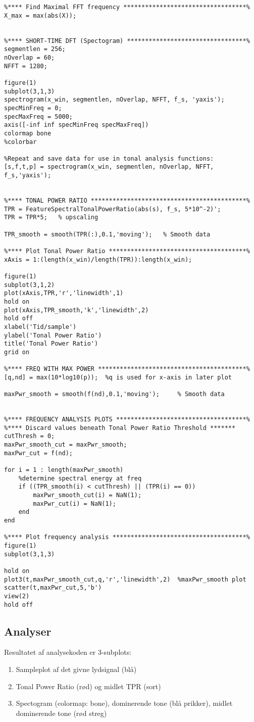 \begin{verbatim}
%**** Find Maximal FFT frequency **********************************%
X_max = max(abs(X));


%**** SHORT-TIME DFT (Spectogram) *********************************%
segmentlen = 256;
nOverlap = 60;
NFFT = 1280;

figure(1)
subplot(3,1,3)
spectrogram(x_win, segmentlen, nOverlap, NFFT, f_s, 'yaxis');
specMinFreq = 0;
specMaxFreq = 5000;
axis([-inf inf specMinFreq specMaxFreq])
colormap bone
%colorbar

%Repeat and save data for use in tonal analysis functions:
[s,f,t,p] = spectrogram(x_win, segmentlen, nOverlap, NFFT, f_s,'yaxis'); 


%**** TONAL POWER RATIO *******************************************% 
TPR = FeatureSpectralTonalPowerRatio(abs(s), f_s, 5*10^-2)';
TPR = TPR*5;   % upscaling

TPR_smooth = smooth(TPR(:),0.1,'moving');   % Smooth data

%**** Plot Tonal Power Ratio **************************************%
xAxis = 1:(length(x_win)/length(TPR)):length(x_win);

figure(1)
subplot(3,1,2)
plot(xAxis,TPR,'r','linewidth',1)
hold on
plot(xAxis,TPR_smooth,'k','linewidth',2)
hold off
xlabel('Tid/sample')
ylabel('Tonal Power Ratio')
title('Tonal Power Ratio')
grid on

%**** FREQ WITH MAX POWER *****************************************%
[q,nd] = max(10*log10(p));  %q is used for x-axis in later plot

maxPwr_smooth = smooth(f(nd),0.1,'moving');     % Smooth data


%**** FREQUENCY ANALYSIS PLOTS ************************************%
%**** Discard values beneath Tonal Power Ratio Threshold *******
cutThresh = 0;
maxPwr_smooth_cut = maxPwr_smooth;
maxPwr_cut = f(nd);

for i = 1 : length(maxPwr_smooth)
    %determine spectral energy at freq
    if ((TPR_smooth(i) < cutThresh) || (TPR(i) == 0))
        maxPwr_smooth_cut(i) = NaN(1);
        maxPwr_cut(i) = NaN(1);
    end
end

%**** Plot frequency analysis *************************************%
figure(1)
subplot(3,1,3)

hold on
plot3(t,maxPwr_smooth_cut,q,'r','linewidth',2)  %maxPwr_smooth plot
scatter(t,maxPwr_cut,5,'b')
view(2)
hold off

\end{verbatim}

\newpage
\subsection{Analyser}
Resultatet af analysekoden er 3-subplots:
\begin{enumerate}
	\item Sampleplot af det givne lydsignal (blå)
	\item Tonal Power Ratio (rød) og midlet TPR (sort)
	\item Spectogram (colormap: bone), dominerende tone (blå prikker), midlet dominerende tone (rød streg)
\end{enumerate}


